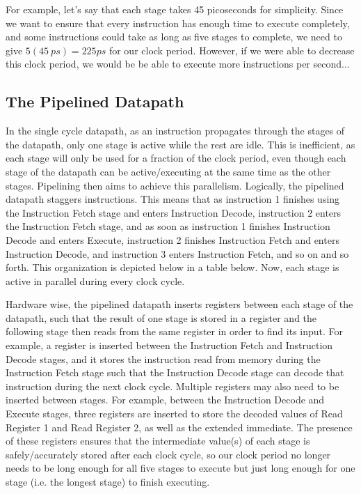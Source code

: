 \documentclass{article}
\begin{document}
For example, let's say that each stage takes 45 picoseconds for simplicity. Since we want to ensure that every instruction has enough time to execute completely, and some instructions could take as long as five stages to complete, we need to give $5(45 \ ps) = 225ps$ for our clock period. However, if we were able to decrease this clock period, we would be be able to execute more instructions per second...

\subsection{The Pipelined Datapath}
In the single cycle datapath, as an instruction propagates through the stages of the datapath, only one stage is active while the rest are idle. This is inefficient, as each stage will only be used for a fraction of the clock period, even though each stage of the datapath can be active/executing at the same time as the other stages. Pipelining then aims to achieve this parallelism. Logically, the pipelined datapath staggers instructions. This means that as instruction 1 finishes using the Instruction Fetch stage and enters Instruction Decode, instruction 2 enters the Instruction Fetch stage, and as soon as instruction 1 finishes Instruction Decode and enters Execute, instruction 2 finishes Instruction Fetch and enters Instruction Decode, and instruction 3 enters Instruction Fetch, and so on and so forth. This organization is depicted below in a table below. Now, each stage is active in parallel during every clock cycle. 

Hardware wise, the pipelined datapath inserts registers between each stage of the datapath, such that the result of one stage is stored in a register and the following stage then reads from the same register in order to find its input. For example, a register is inserted between the Instruction Fetch and Instruction Decode stages, and it stores the instruction read from memory during the Instruction Fetch stage such that the Instruction Decode stage can decode that instruction during the next clock cycle. Multiple registers may also need to be inserted between stages. For example, between the Instruction Decode and Execute stages, three registers are inserted to store the decoded values of Read Register 1 and Read Register 2, as well as the extended immediate. The presence of these registers ensures that the intermediate value(s) of each stage is safely/accurately stored after each clock cycle, so our clock period no longer needs to be long enough for all five stages to execute but just long enough for one stage (i.e. the longest stage) to finish executing.
\end{document}
